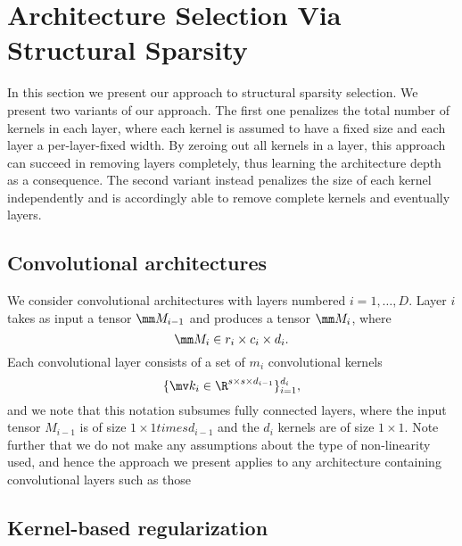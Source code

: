 \section{Architecture Selection Via Structural Sparsity}
In this section we present our approach to structural sparsity selection. We present two variants of our approach. The first one penalizes the total number of kernels in each layer, where each kernel is assumed to have a fixed size and each layer a per-layer-fixed width. By zeroing out all kernels in a layer, this approach can succeed in removing layers completely, thus learning the architecture depth as a consequence. The second variant instead penalizes the size of each kernel independently and is accordingly able to remove complete kernels and eventually layers.

\subsection{Convolutional architectures}
We consider convolutional architectures with layers numbered $i=1,\ldots,D$. Layer $i$ takes as input a tensor $\mm M_{i-1}$ and produces a tensor $\mm M_i$, where
\begin{equation}
\mm M_{i} \in r_i \times c_i \times d_i.
\end{equation}
Each convolutional layer consists of a set of $m_i$ convolutional kernels 
\begin{equation}
\{\mv k_i \in \R^{s \times s \times d_{i-1}}\}_{i=1}^{d_i},
\end{equation}
and we note that this notation subsumes fully connected layers, where the input tensor $M_{i-1}$ is of size $1 \times 1 times d_{i-1}$ and the $d_i$ kernels are of size $1 \times 1$. Note further that we do not make any assumptions about the type of non-linearity used, and hence the approach we present applies to any architecture containing convolutional layers such as those 

\subsection{Kernel-based regularization}


